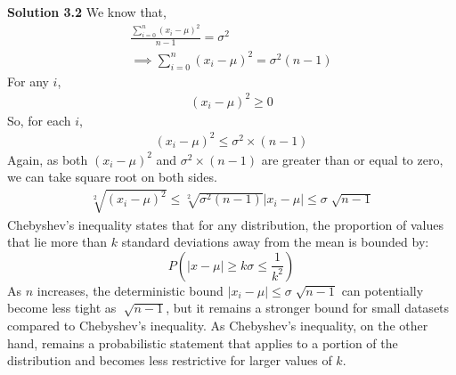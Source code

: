 \begin{tcolorbox}[breakable]
\begin{sol}
		\textbf{Solution 3.2}
		We know that,
		\begin{align*}
			\frac{\sum^n_{i=0}(x_i-\mu)^2}{n-1}=\sigma^2 \\
			\implies \sum^n_{i=0}(x_i-\mu)^2 = \sigma^2(n-1)
		\end{align*}
		For any $i$,
		\begin{align*}
			(x_i-\mu)^2\geq0
		\end{align*}
		So, for each $i$,
		\begin{align*}
			(x_i-\mu)^2\leq\sigma^2\times(n-1)
		\end{align*}
		Again, as both $(x_i-\mu)^2$ and $\sigma^2\times(n-1)$ are greater than or equal to zero, we can take square root on both sides.
		\begin{align*}
			\sqrt[2]{(x_i-\mu)^2}\leq\sqrt[2]{\sigma^2(n-1)}
			|x_i-\mu|\leq\sigma\sqrt[]{n-1}
		\end{align*}
		Chebyshev's inequality states that for any distribution, the proportion of values that lie more than $k$ standard deviations away from the mean is bounded by:
		\[P(|x-\mu | \geq k\sigma\leq \frac{1}{k^2})\]
		As $n$ increases, the deterministic bound $|x_i-\mu|\leq \sigma\sqrt[]{n-1}$ can potentially become less tight as $\sqrt[]{n-1}$, but it remains a stronger bound for small datasets compared to Chebyshev's inequality. As Chebyshev's inequality, on the other hand, remains a probabilistic statement that applies to a portion of the distribution and becomes less restrictive for larger values of $k$.
	\end{sol}
\end{tcolorbox}
